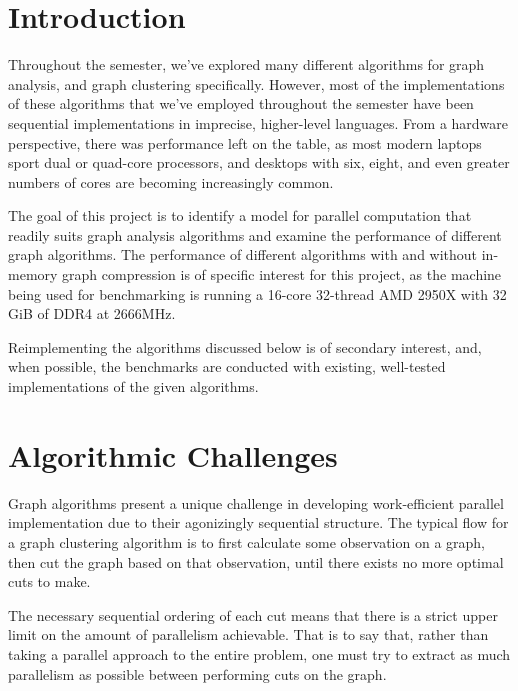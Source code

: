 




\section{Introduction}

Throughout the semester, we've explored many different algorithms for
graph analysis, and graph clustering specifically.  However, most of the
implementations of these algorithms that we've employed throughout the
semester have been sequential implementations in imprecise, higher-level
languages.  From a hardware perspective, there was performance left on
the table, as most modern laptops sport dual or quad-core processors,
and desktops with six, eight, and even greater numbers of cores are
becoming increasingly common.

The goal of this project is to identify a model for parallel computation
that readily suits graph analysis algorithms and examine the performance
of different graph algorithms.  The performance of different algorithms
with and without in-memory graph compression is of specific interest for
this project, as the machine being used for benchmarking is running a
16-core 32-thread AMD 2950X with 32 GiB of DDR4 at 2666MHz.

Reimplementing the algorithms discussed below is of secondary interest,
and, when possible, the benchmarks are conducted with existing,
well-tested implementations of the given algorithms.

\section{Algorithmic Challenges}

Graph algorithms present a unique challenge in developing work-efficient
parallel implementation due to their agonizingly sequential structure.
The typical flow for a graph clustering algorithm is to first calculate
some observation on a graph, then cut the graph based on that
observation, until there exists no more optimal cuts to make.

The necessary sequential ordering of each cut means that there is a
strict upper limit on the amount of parallelism achievable. That is to
say that, rather than taking a parallel approach to the entire problem,
one must try to extract as much parallelism as possible between
performing cuts on the graph.

